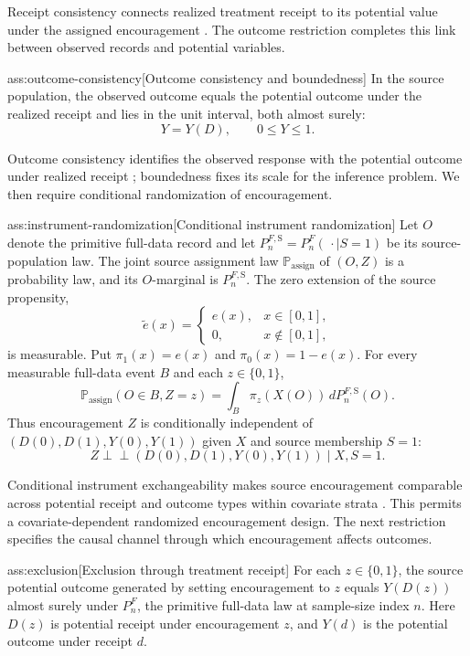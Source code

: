 Receipt consistency connects realized treatment receipt to its potential value under the assigned encouragement \citep{ChenHuang2025Generalizing}. The outcome restriction completes this link between observed records and potential variables.

\begin{assumptionv}{ass:outcome-consistency}[Outcome consistency and boundedness]
In the source population, the observed outcome equals the potential outcome under the realized receipt and lies in the unit interval, both almost surely:
\[
Y=Y(D), \qquad 0\le Y\le 1.
\]
\end{assumptionv}

Outcome consistency identifies the observed response with the potential outcome under realized receipt \citep{ChenHuang2025Generalizing}; boundedness fixes its scale for the inference problem. We then require conditional randomization of encouragement.

\begin{assumptionv}{ass:instrument-randomization}[Conditional instrument randomization]
Let \(O\) denote the primitive full-data record and let \(P_n^{F,\mathrm S}=P_n^F(\,\cdot\mid S=1)\) be its source-population law. The joint source assignment law \(\mathbb P_{\mathrm{assign}}\) of \((O,Z)\) is a probability law, and its \(O\)-marginal is \(P_n^{F,\mathrm S}\). The zero extension of the source propensity,
\[
\widetilde e(x)=
\begin{cases}
e(x),&x\in[0,1],\\
0,&x\notin[0,1],
\end{cases}
\]
is measurable. Put \(\pi_1(x)=e(x)\) and \(\pi_0(x)=1-e(x)\). For every measurable full-data event \(B\) and each \(z\in\{0,1\}\),
\[
\mathbb P_{\mathrm{assign}}(O\in B, Z=z)
=\int_B \pi_z(X(O))\,dP_n^{F,\mathrm S}(O).
\]
Thus encouragement \(Z\) is conditionally independent of \((D(0),D(1),Y(0),Y(1))\) given \(X\) and source membership \(S=1\):
\[
Z\perp\!\!\!\perp (D(0),D(1),Y(0),Y(1))\mid X,S=1.
\]
\end{assumptionv}

Conditional instrument exchangeability makes source encouragement comparable across potential receipt and outcome types within covariate strata \citep{ChenHuang2025Generalizing}. This permits a covariate-dependent randomized encouragement design. The next restriction specifies the causal channel through which encouragement affects outcomes.

\begin{assumptionv}{ass:exclusion}[Exclusion through treatment receipt]
For each \(z\in\{0,1\}\), the source potential outcome generated by setting encouragement to \(z\) equals \(Y(D(z))\) almost surely under \(P_n^F\), the primitive full-data law at sample-size index \(n\). Here \(D(z)\) is potential receipt under encouragement \(z\), and \(Y(d)\) is the potential outcome under receipt \(d\).
\end{assumptionv}

